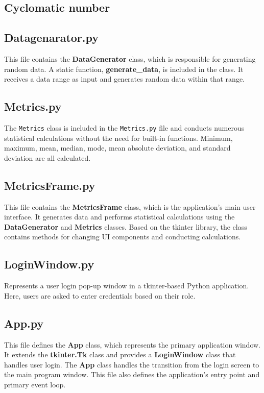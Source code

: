 {{{\subsection{Cyclomatic number}

\subsection*{\textbf{Datagenarator.py}}

This file contains the \textbf{DataGenerator} class, which is responsible for generating random data. A static function, \textbf{generate\_data}, is included in the class. It receives a data range as input and generates random data within that range.

\subsection*{\textbf{Metrics.py}}

The \texttt{Metrics} class is included in the \texttt{Metrics.py} file and conducts numerous statistical calculations without the need for built-in functions. Minimum, maximum, mean, median, mode, mean absolute deviation, and standard deviation are all calculated.

\subsection*{\textbf{MetricsFrame.py}}

This file contains the \textbf{MetricsFrame} class, which is the application's main user interface. It generates data and performs statistical calculations using the \textbf{DataGenerator} and \textbf{Metrics} classes. Based on the tkinter library, the class contains methods for changing UI components and conducting calculations.

\subsection*{\textbf{LoginWindow.py}}

Represents a user login pop-up window in a tkinter-based Python application. Here, users are asked to enter credentials based on their role.

\subsection*{\textbf{App.py}}

This file defines the \textbf{App} class, which represents the primary application window. It extends the \textbf{tkinter.Tk} class and provides a \textbf{LoginWindow} class that handles user login. The \textbf{App} class handles the transition from the login screen to the main program window. This file also defines the application's entry point and primary event loop.
\linebreak


}}}
